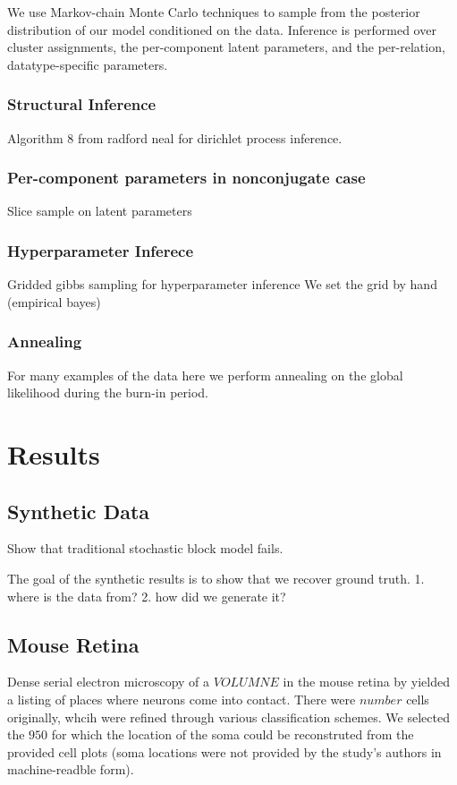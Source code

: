 \documentclass{article}
\begin{document}
We use Markov-chain Monte Carlo techniques to sample from the posterior 
distribution of our model conditioned on the data. Inference is
performed over cluster assignments, the per-component latent parameters, 
and the per-relation, datatype-specific parameters. 


\subsubsection{Structural Inference}
Algorithm 8 from radford neal \autocite{Neal2000} for dirichlet process
inference. 


\subsubsection{Per-component parameters in nonconjugate case}
Slice sample on latent parameters \autocite{Neal2003}


\subsubsection{Hyperparameter Inferece}
Gridded gibbs sampling for hyperparameter inference
We set the grid by hand (empirical bayes)


\subsubsection{Annealing}
For many examples of the data here we perform annealing on the global likelihood during the burn-in period.  


\section{Results}

\subsection{Synthetic Data}
Show that traditional stochastic block model fails. 


The goal of the synthetic results is to show that we recover ground truth. 
1. where is the data from? 
2. how did we generate it? 


\subsection{Mouse Retina}

Dense serial electron microscopy of a $VOLUMNE$ in the mouse
retina by \autocite{Helmstaedter2013} yielded a listing of places where
neurons come into contact. There were $number$ cells originally, whcih
were refined through various classification schemes. We selected the
$950$ for which the location of the soma could be reconstruted from
the provided cell plots (soma locations were not provided by the
study's authors in machine-readble form).
\end{document}
